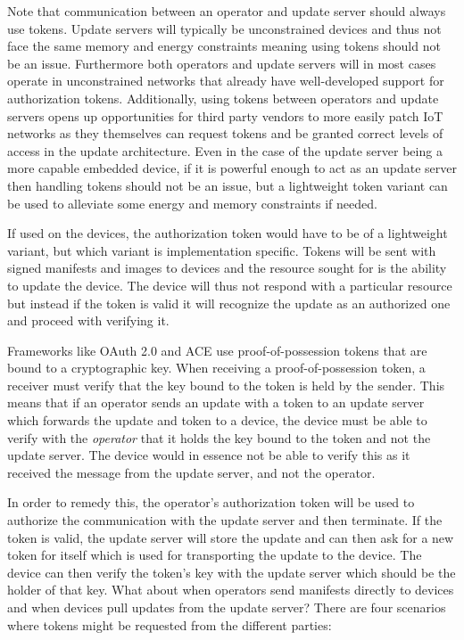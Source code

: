 \documentclass[0-thesis.tex]{subfiles}
\begin{document}
Note that communication between an operator and update server should always use tokens.
Update servers will typically be unconstrained devices and thus not face the same memory
and energy constraints meaning using tokens should not be an issue. Furthermore both
operators and update servers will in most cases operate in unconstrained networks that
already have well-developed support for authorization tokens. Additionally, using tokens
between operators and update servers opens up opportunities for third party vendors to
more easily patch IoT networks as they themselves can request tokens and be granted
correct levels of access in the update architecture. Even in the case of the update server
being a more capable embedded device, if it is powerful enough to act as an update server
then handling tokens should not be an issue, but a lightweight token variant can be used
to alleviate some energy and memory constraints if needed.

If used on the devices, the authorization token would have to be of a lightweight variant,
but which variant is implementation specific. Tokens will be sent with signed manifests
and images to devices and the resource sought for is the ability to update the device. The
device will thus not respond with a particular resource but instead if the token is valid
it will recognize the update as an authorized one and proceed with verifying it.

Frameworks like OAuth 2.0 and ACE use proof-of-possession tokens that are bound to a
cryptographic key. When receiving a proof-of-possession token, a receiver must verify that
the key bound to the token is held by the sender. This means that if an operator sends an
update with a token to an update server which forwards the update and token to a device,
the device must be able to verify with the \textit{operator} that it holds the key bound
to the token and not the update server. The device would in essence not be able to verify
this as it received the message from the update server, and not the operator.

In order to remedy this, the operator's authorization token will be used to authorize the
communication with the update server and then terminate. If the token is valid, the update
server will store the update and can then ask for a new token for itself which is used for
transporting the update to the device. The device can then verify the token's key with the
update server which should be the holder of that key. What about when operators send
manifests directly to devices and when devices pull updates from the update server? There
are four scenarios where tokens might be requested from the different parties:
\end{document}
